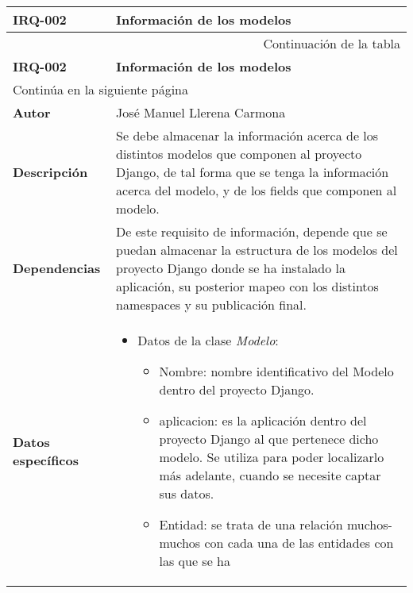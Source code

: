 \begin{center}
\begin{longtable}{||p{3.4cm}|p{12cm}||}
 \hline \hline \bf IRQ-002 &  \bf Información de los modelos \\
\hline
\endfirsthead
\hline \multicolumn{2}{|r|}{{Continuación de la tabla}} \\ \hline
 \hline \bf IRQ-002 &  \bf Información de los modelos \\
\hline
\endhead
\hline \multicolumn{2}{|l|}{{Continúa en la siguiente página}} \\ \hline
\endfoot
\endlastfoot
 \hline \bf Autor & José Manuel Llerena Carmona \\
 \hline \bf Descripción & Se debe almacenar la información acerca de los
             distintos modelos que componen al proyecto Django, de tal forma que
             se tenga la información acerca del modelo, y de los fields que
             componen al modelo.\\
 \hline \bf Dependencias & De este requisito de información, depende que se
                            puedan almacenar la estructura de los modelos del
                            proyecto Django donde se ha instalado la aplicación,
                            su posterior mapeo con los distintos namespaces y su
                            publicación final.\\
 \hline \bf Datos específicos &
             \begin{itemize} 
                 \item Datos de la clase \textit{Modelo}:
                 \begin{itemize}
                    \item Nombre: nombre identificativo del Modelo dentro del
                                   proyecto Django.
                    \item aplicacion: es la aplicación dentro del proyecto
                                       Django al que pertenece dicho modelo. Se
                                       utiliza para poder localizarlo más
                                       adelante, cuando se necesite captar sus
                                       datos.
                    \item Entidad: se trata de una relación muchos-muchos con
                                    cada una de las entidades con las que se ha

\end{itemize}
\end{itemize}
\end{longtable}
\end{center}
